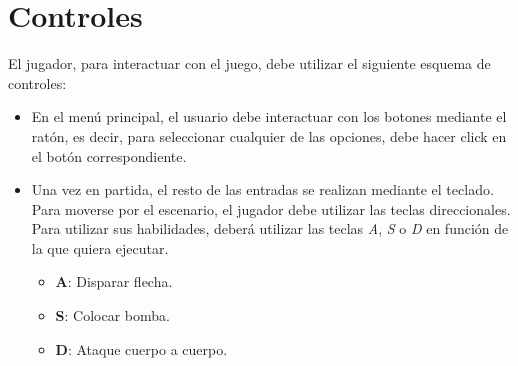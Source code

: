 	\section{Controles}

		El jugador, para interactuar con el juego, debe utilizar el siguiente esquema de controles:

		\begin{itemize}

			\item En el menú principal, el usuario debe interactuar con los botones mediante el ratón, es decir, para seleccionar cualquier de las opciones, debe hacer click en el botón correspondiente.

			\item Una vez en partida, el resto de las entradas se realizan mediante el teclado. Para moverse por el escenario, el jugador debe utilizar las teclas direccionales. Para utilizar sus habilidades, deberá utilizar las teclas \textit{A}, \textit{S} o \textit{D} en función de la que quiera ejecutar.

			\begin{itemize}

				\item \textbf{A}: Disparar flecha.

				\item \textbf{S}: Colocar bomba.

				\item \textbf{D}: Ataque cuerpo a cuerpo.

			\end{itemize}

		\end{itemize}